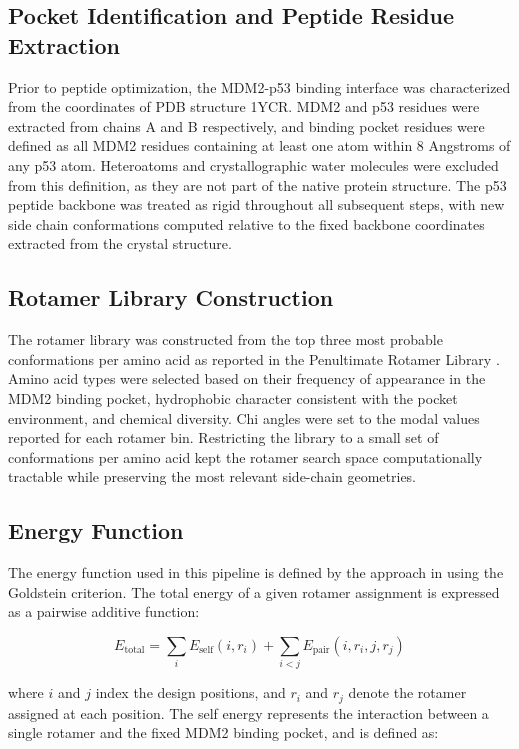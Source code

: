 \subsection{Pocket Identification and Peptide Residue Extraction}
Prior to peptide optimization, the MDM2-p53 binding interface was characterized from the coordinates of PDB structure 1YCR. MDM2 and p53 residues were extracted from chains A and B respectively, and binding pocket residues were defined as all MDM2 residues containing at least one atom within 8 Angstroms of any p53 atom. Heteroatoms and crystallographic water molecules were excluded from this definition, as they are not part of the native protein structure. The p53 peptide backbone was treated as rigid throughout all subsequent steps, with new side chain conformations computed relative to the fixed backbone coordinates extracted from the crystal structure.

\subsection{Rotamer Library Construction}
The rotamer library was constructed from the top three most probable conformations per amino acid as reported in the Penultimate Rotamer Library \cite{rotamerlib}. Amino acid types were selected based on their frequency of appearance in the MDM2 binding pocket, hydrophobic character consistent with the pocket environment, and chemical diversity. Chi angles were set to the modal values reported for each rotamer bin. Restricting the library to a small set of conformations per amino acid kept the rotamer search space computationally tractable while preserving the most relevant side-chain geometries.

\subsection{Energy Function}
The energy function used in this pipeline is defined by the approach in \cite{Dahiyat} using the Goldstein criterion. The total energy of a given rotamer assignment is expressed as a pairwise additive function:

\begin{equation}
E_{\text{total}} = \sum_{i} E_{\text{self}}(i, r_i) + \sum_{i < j} 
E_{\text{pair}}(i, r_i, j, r_j)
\label{eq:total_energy}
\end{equation}

\noindent where $i$ and $j$ index the design positions, and $r_i$ and $r_j$ denote the rotamer assigned at each position. The self energy represents the interaction between a single rotamer and the fixed MDM2 binding pocket, and is defined as:

